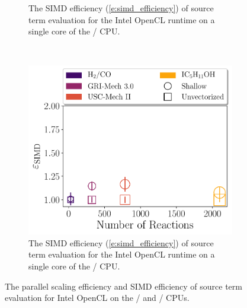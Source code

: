 \documentclass[12pt,number,sort&compress,preprint]{elsarticle}
\begin{document}
\begin{figure}[htbp]
\begin{subfigure}[t]{0.48\linewidth}
      \caption{The SIMD efficiency (\cref{e:simd_efficiency}) of source term evaluation for the Intel OpenCL runtime on a single core of the \avx/ CPU.}
      \label{F:source_simd_scaling}
  \end{subfigure}
  \\
  \begin{subfigure}[t]{0.48\linewidth}
      \includegraphics[width=\textwidth]{source_sse_simd_efficiency.pdf}
      \caption{The SIMD efficiency (\cref{e:simd_efficiency}) of source term evaluation for the Intel OpenCL runtime on a single core of the \sse/ CPU.}
      \label{F:source_sse_simd_scaling}
  \end{subfigure}
  \caption{The parallel scaling efficiency and SIMD efficiency of source term evaluation for Intel OpenCL on the \avx/ and \sse/ CPUs.}
  \label{F:source_scaling}
\end{figure}
\end{document}
